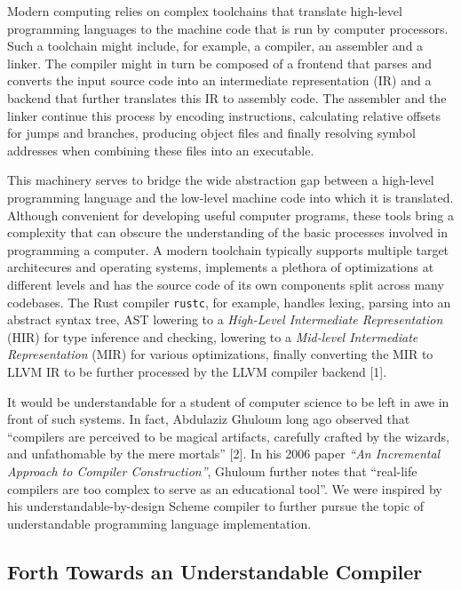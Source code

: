 \documentclass[a4paper,12pt,final]{article}
\makeatletter
\newcommand{\citeprocitem}[2]{\hyper@linkstart{cite}{citeproc_bib_item_#1}#2\hyper@linkend}
\makeatother
\begin{document}
Modern computing relies on complex toolchains that translate
high-level programming languages to the machine code that is run by
computer processors.  Such a toolchain might include, for example, a
compiler, an assembler and a linker.  The compiler might in turn be
composed of a frontend that parses and converts the input source code
into an intermediate representation (IR) and a backend that further
translates this IR to assembly code.  The assembler and the linker
continue this process by encoding instructions, calculating relative
offsets for jumps and branches, producing object files and finally
resolving symbol addresses when combining these files into an
executable.

This machinery serves to bridge the wide abstraction gap between a
high-level programming language and the low-level machine code into
which it is translated.  Although convenient for developing useful
computer programs, these tools bring a complexity that can obscure the
understanding of the basic processes involved in programming a
computer.  A modern toolchain typically supports multiple target
architecures and operating systems, implements a plethora of
optimizations at different levels and has the source code of its own
components split across many codebases.  The Rust compiler \texttt{rustc},
for example, handles lexing, parsing into an abstract syntax tree, AST
lowering to a \emph{High-Level Intermediate Representation} (HIR) for type
inference and checking, lowering to a \emph{Mid-level Intermediate
Representation} (MIR) for various optimizations, finally converting
the MIR to LLVM IR to be further processed by the LLVM compiler
backend \citeprocitem{1}{[1]}.

It would be understandable for a student of computer science to be
left in awe in front of such systems.  In fact, Abdulaziz Ghuloum long
ago observed that ``compilers are perceived to be magical artifacts,
carefully crafted by the wizards, and unfathomable by the mere
mortals'' \citeprocitem{2}{[2]}.  In his 2006 paper \emph{``An Incremental
Approach to Compiler Construction''}, Ghuloum further notes that
``real-life compilers are too complex to serve as an educational
tool''.  We were inspired by his understandable-by-design Scheme
compiler to further pursue the topic of understandable programming
language implementation.

\subsection{Forth Towards an Understandable Compiler}
\label{sec:orgdea754d}
\end{document}
